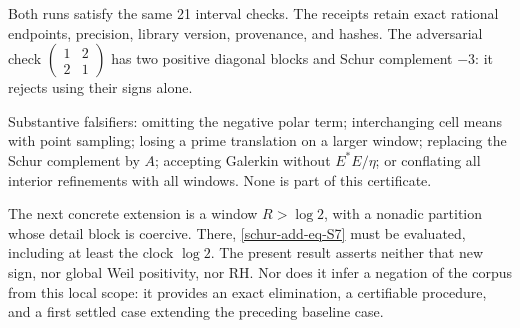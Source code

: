 
Both runs satisfy the same 21 interval checks.
The receipts retain exact rational endpoints, precision, library
version, provenance, and hashes. The adversarial check
\(\begin{pmatrix}1&2\\2&1\end{pmatrix}\) has two positive diagonal
blocks and Schur complement \(-3\): it rejects using their signs alone.

Substantive falsifiers: omitting the negative polar term; interchanging cell
means with point sampling; losing a prime translation on a
larger window; replacing the Schur complement by \(A\); accepting Galerkin without
\(E^*E/\eta\); or conflating all interior refinements with
all windows. None is part of this certificate.

The next concrete extension is a window \(R>\log2\), with
a nonadic partition whose detail block is coercive. There,
\eqref{schur-add-eq-S7} must be evaluated, including at least the clock \(\log2\).
The present result asserts neither that new sign, nor global Weil
positivity, nor RH. Nor does it infer a negation of the corpus from
this local scope: it provides an exact elimination, a certifiable
procedure, and a first settled case extending the preceding baseline case.

